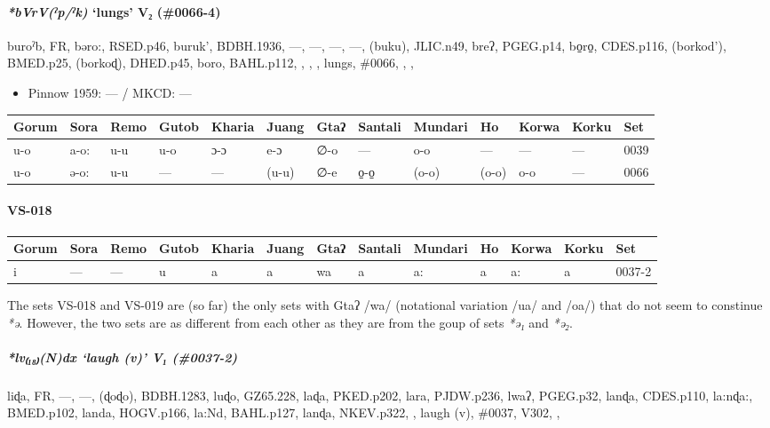 \documentclass[a4paper,]{article}
\providecommand{\tightlist}{%
  \setlength{\itemsep}{0pt}\setlength{\parskip}{0pt}}
\let\oldparagraph\paragraph
\renewcommand{\paragraph}[1]{\oldparagraph{#1}\mbox{}}
\let\oldsubparagraph\subparagraph
\renewcommand{\subparagraph}[1]{\oldsubparagraph{#1}\mbox{}}
\begin{document}
\paragraph{\texorpdfstring{\emph{*bVrV(ˀp/ˀk)} `lungs' V₂
(\#0066-4)}{*bVrV(ˀp/ˀk) lungs V₂ (\#0066-4)}}\label{bvrvux2c0pux2c0k-lungs-v-0066-4}

buroˀb, FR, bəro:, RSED.p46, buruk', BDBH.1936, ---, ---, ---, ---,
(buku), JLIC.n49, breʔ, PGEG.p14, bo̠ro̠, CDES.p116, (borkod'), BMED.p25,
(borkoɖ), DHED.p45, boro, BAHL.p112, , , , lungs, \#0066, , ,

\begin{itemize}
\tightlist
\item
  Pinnow 1959: --- / MKCD: ---
\end{itemize}

\begin{longtable}[]{@{}lllllllllllll@{}}
\toprule
Gorum & Sora & Remo & Gutob & Kharia & Juang & Gtaʔ & Santali & Mundari
& Ho & Korwa & Korku & Set\tabularnewline
\midrule
\endhead
u-o & a-o: & u-u & u-o & ɔ-ɔ & e-ɔ & ∅-o & --- & o-o & --- & --- & --- &
0039\tabularnewline
u-o & ə-o: & u-u & --- & --- & (u-u) & ∅-e & o̠-o̠ & (o-o) & (o-o) & o-o &
--- & 0066\tabularnewline
\bottomrule
\end{longtable}

\paragraph{VS-018}\label{vs-018}

\begin{longtable}[]{@{}lllllllllllll@{}}
\toprule
Gorum & Sora & Remo & Gutob & Kharia & Juang & Gtaʔ & Santali & Mundari
& Ho & Korwa & Korku & Set\tabularnewline
\midrule
\endhead
i & --- & --- & u & a & a & wa & a & a: & a & a: & a &
0037-2\tabularnewline
\bottomrule
\end{longtable}

The sets VS-018 and VS-019 are (so far) the only sets with Gtaʔ /wa/
(notational variation /ua/ and /oa/) that do not seem to constinue
\emph{*ə}. However, the two sets are as different from each other as
they are from the goup of sets \emph{*ə₁} and \emph{*ə₂}.

\subparagraph{\texorpdfstring{\emph{*lv₍₁₈₎(N)dx} `laugh (v)' V₁
(\#0037-2)}{*lv₍₁₈₎(N)dx laugh (v) V₁ (\#0037-2)}}\label{lvndx-laugh-v-v-0037-2}

liɖa, FR, ---, ---, (ɖoɖo), BDBH.1283, luɖo, GZ65.228, laɖa, PKED.p202,
lara, PJDW.p236, lwaʔ, PGEG.p32, lanɖa, CDES.p110, la:nɖa:, BMED.p102,
landa, HOGV.p166, la:Nd, BAHL.p127, lanɖa, NKEV.p322, , laugh (v),
\#0037, V302, ,
\end{document}
